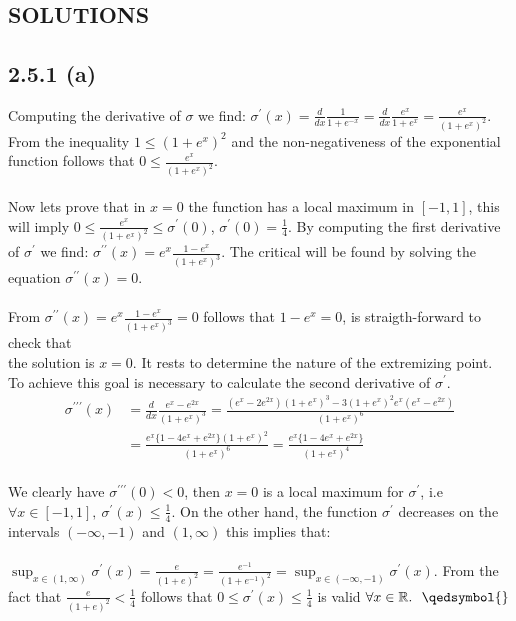 \documentclass{exam}
\begin{document}
\newpage

\begin{center}    
    \section*{SOLUTIONS}
\end{center}

\subsection*{2.5.1 (a)}
Computing the derivative of $\sigma$ we find: $\sigma^\prime(x) = \frac{d}{dx} \frac{1}{ 1 + e^{-x}} = \frac{d}{dx} \frac{e^x}{ 1 + e^{x}} = \frac{e^x}{(1 + e^{x})^2}$. From the inequality $1 \leq (1+e^x)^2$ and the non-negativeness of the exponential function follows that 
$0 \leq \frac{e^x}{(1 + e^{x})^2}$. \\
\\
Now lets prove that in $x=0$ the function has a local maximum in $[-1,1]$, this will imply $0 \leq \frac{e^x}{(1 + e^{x})^2} \leq \sigma^\prime(0)$, $\sigma^\prime(0) = \frac{1}{4}$. By computing the first derivative of $\sigma^\prime$ we find: 
$\sigma^{\prime\prime}(x) = e^{x}\frac{1-e^{x}}{(1 + e^{x})^3}$. The critical will be found by solving the equation $\sigma^{\prime\prime}(x) = 0$. \\
\\
From $\sigma^{\prime\prime}(x) = e^{x}\frac{1-e^{x}}{(1 + e^{x})^3} = 0$ follows that $1 - e^x = 0$, is straigth-forward to check that \\
the solution is $x=0$. It rests to determine the nature of the extremizing point. To achieve this goal is necessary to calculate the second derivative of $\sigma^{\prime}$.
\begin{equation*}     
        \begin{aligned}
            \sigma^{\prime\prime\prime}(x) &= \frac{d}{ d x} \frac{e^{x}-e^{2x}}{(1 + e^{x})^3} = \frac{(e^x - 2e^{2x})(1 + e^x)^3 - 3(1 + e^x)^2 e^{x}(e^x - e^{2x})}{(1 + e^x)^6}\\
            &= \frac{e^{x} \{ 1 - 4e^x + e^{2x} \}(1 + e^x)^2}{(1 + e^x)^{6}} = \frac{e^{x} \{ 1 - 4e^x + e^{2x} \}}{(1 + e^x)^{4}}
        \end{aligned}
\end{equation*}
\\
We clearly have $\sigma^{\prime\prime\prime}(0) < 0$, then $x = 0$ is a local maximum for $\sigma^\prime$, i.e $\forall x \in [-1, 1], \ \sigma^\prime(x) \leq \frac{1}{4}$. On the other hand,
the function $\sigma^\prime$ decreases on the intervals $(-\infty,-1)$ and $(1, \infty)$ this implies that:\\
\\
$\displaystyle\sup_{x \in (1,\infty)}\sigma^{\prime}(x) = \displaystyle\frac{e}{(1 + e)^2} = \displaystyle\frac{e^{-1}}{(1 + e^{-1})^2} = \sup_{x \in (-\infty,-1)} \sigma^{\prime}(x)$.
From the fact that $\displaystyle\frac{e}{(1 + e)^2} < \frac{1}{4}$ follows that $ 0 \leq \sigma^\prime(x) \leq \frac{1}{4}$ is valid $\forall x \in \mathbb{R}. \text{ \ \qedsymbol{}}$\\
\end{document}
